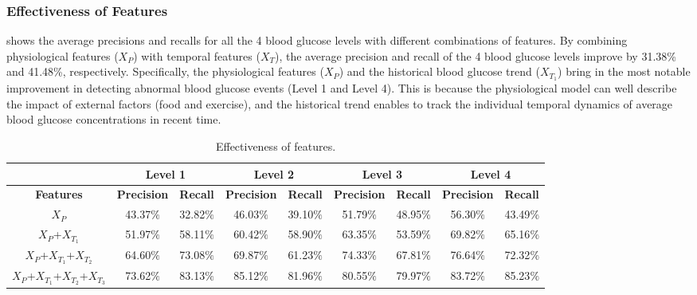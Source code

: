 \subsubsection{Effectiveness of Features}
 shows the average precisions and recalls for all the 4 blood glucose levels with different combinations of features.
By combining physiological features ($X_{P}$) with temporal features ($X_{T}$), the average precision and recall of the 4 blood glucose levels improve by 31.38\% and 41.48\%, respectively.
Specifically, the physiological features ($X_{P}$) and the historical blood glucose trend ($X_{T_1}$) bring in the most notable improvement in detecting abnormal blood glucose events (Level 1 and Level 4).
This is because the physiological model can well describe the impact of external factors (\eg food and exercise), and the historical trend enables to track the individual temporal dynamics of average blood glucose concentrations in recent time.

\begin{table}[h]
  \small
  \centering
  \caption{Effectiveness of features.}
  \label{tab:features}
  \begin{tabular}{|c|c|c|c|c|c|c|c|c|}
  \hline
                                   & \multicolumn{2}{c|}{\textbf{Level 1}}                     & \multicolumn{2}{c|}{\textbf{Level 2}} & \multicolumn{2}{c|}{\textbf{Level 3}}                     & \multicolumn{2}{c|}{\textbf{Level 4}}                     \\ \hline
  \textbf{Features}                  & \textbf{Precision} & \multicolumn{1}{l|}{\textbf{Recall}} & \textbf{Precision}  & \textbf{Recall} & \textbf{Precision} & \multicolumn{1}{l|}{\textbf{Recall}} & \textbf{Precision} & \multicolumn{1}{l|}{\textbf{Recall}} \\ \hline
  $X_{P}$                            & 43.37$\%$               & 32.82$\%$                                 & 46.03$\%$                & 39.10$\%$            & 51.79$\%$               & 48.95$\%$                                 & 56.30$\%$               & 43.49$\%$                                 \\ \hline
  $X_{P}$+$X_{T_1}$                   & 51.97$\%$               & 58.11$\%$                                 & 60.42$\%$                & 58.90$\%$            & 63.35$\%$               & 53.59$\%$                                 & 69.82$\%$               & 65.16$\%$                                 \\ \hline
  $X_{P}$+$X_{T_1}$+$X_{T_2}$          & 64.60$\%$               & 73.08$\%$                                 & 69.87$\%$                & 61.23$\%$            & 74.33$\%$               & 67.81$\%$                                 & 76.64$\%$               & 72.32$\%$                                 \\ \hline
  $X_{P}$+$X_{T_1}$+$X_{T_2}$+$X_{T_3}$ & 73.62$\%$   & 83.13$\%$                                 & 85.12$\%$               & 81.96$\%$            & 80.55$\%$   & 79.97$\%$
  & 83.72$\%$               & 85.23$\%$                                  \\ \hline
  \end{tabular}
\end{table}


